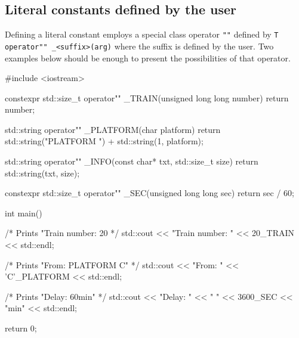 \documentclass[../main]{subfiles}
\begin{document}
\subsection{Literal constants defined by the user}
    Defining a literal constant employs a special class operator \texttt{""} defined by\linebreak
\texttt{T operator"" \_<suffix>(arg)} where the suffix is defined by the user. Two examples below should be enough to present the possibilities of that operator.\newline
\begin{Code}
    #include <iostream>
    
    constexpr std::size_t operator"" _TRAIN(unsigned long long number)
    {
    	return number;
    }
    
    std::string operator"" _PLATFORM(char platform)
    {
        return std::string("PLATFORM ") + std::string(1, platform);
    }
    
    std::string operator"" _INFO(const char* txt, std::size_t size)
    {
        return std::string(txt, size);
    }
    
    constexpr std::size_t operator"" _SEC(unsigned long long sec)
    {
        return sec / 60;
    }
    
    int main()
    {
        /* Prints "Train number: 20 */
        std::cout << "Train number: " << 20_TRAIN << std::endl;

        /* Prints "From: PLATFORM C" */
        std::cout << "From: " << 'C'_PLATFORM << std::endl;

        /* Prints "Delay: 60min" */
        std::cout << "Delay: " << " " << 3600_SEC << "min" << std::endl;
    
        return 0;
    }
\end{Code}
\end{document}
